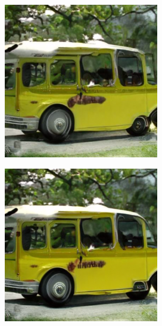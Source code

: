 \documentclass{article}
\begin{document}
\begin{figure}
\begin{subfigure}[b]{0.19\linewidth}
    \end{subfigure}
    \begin{subfigure}[b]{0.19\linewidth}
    \includegraphics[width=\linewidth]{figures/imagenet256/solver_samples/imagenet256_fm_ot_16_20.png}
    \end{subfigure}
    \begin{subfigure}[b]{0.19\linewidth}
    \includegraphics[width=\linewidth]{figures/imagenet256/solver_samples/imagenet256_fm_ot_16_30.png}

\end{subfigure}
\end{figure}
\end{document}
